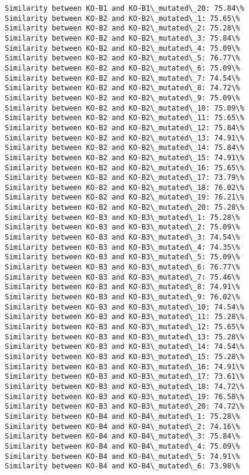 \documentclass[11pt]{article}
\begin{document}
\begin{Verbatim}[commandchars=\\\{\}]
Similarity between KO-B1 and KO-B1\_mutated\_20: 75.84\%
Similarity between KO-B2 and KO-B2\_mutated\_1: 75.65\%
Similarity between KO-B2 and KO-B2\_mutated\_2: 75.28\%
Similarity between KO-B2 and KO-B2\_mutated\_3: 75.84\%
Similarity between KO-B2 and KO-B2\_mutated\_4: 75.09\%
Similarity between KO-B2 and KO-B2\_mutated\_5: 76.77\%
Similarity between KO-B2 and KO-B2\_mutated\_6: 75.09\%
Similarity between KO-B2 and KO-B2\_mutated\_7: 74.54\%
Similarity between KO-B2 and KO-B2\_mutated\_8: 74.72\%
Similarity between KO-B2 and KO-B2\_mutated\_9: 75.09\%
Similarity between KO-B2 and KO-B2\_mutated\_10: 75.09\%
Similarity between KO-B2 and KO-B2\_mutated\_11: 75.65\%
Similarity between KO-B2 and KO-B2\_mutated\_12: 75.84\%
Similarity between KO-B2 and KO-B2\_mutated\_13: 74.91\%
Similarity between KO-B2 and KO-B2\_mutated\_14: 75.84\%
Similarity between KO-B2 and KO-B2\_mutated\_15: 74.91\%
Similarity between KO-B2 and KO-B2\_mutated\_16: 75.65\%
Similarity between KO-B2 and KO-B2\_mutated\_17: 73.79\%
Similarity between KO-B2 and KO-B2\_mutated\_18: 76.02\%
Similarity between KO-B2 and KO-B2\_mutated\_19: 76.21\%
Similarity between KO-B2 and KO-B2\_mutated\_20: 75.28\%
Similarity between KO-B3 and KO-B3\_mutated\_1: 75.28\%
Similarity between KO-B3 and KO-B3\_mutated\_2: 75.09\%
Similarity between KO-B3 and KO-B3\_mutated\_3: 74.54\%
Similarity between KO-B3 and KO-B3\_mutated\_4: 74.35\%
Similarity between KO-B3 and KO-B3\_mutated\_5: 75.09\%
Similarity between KO-B3 and KO-B3\_mutated\_6: 76.77\%
Similarity between KO-B3 and KO-B3\_mutated\_7: 75.46\%
Similarity between KO-B3 and KO-B3\_mutated\_8: 74.91\%
Similarity between KO-B3 and KO-B3\_mutated\_9: 76.02\%
Similarity between KO-B3 and KO-B3\_mutated\_10: 74.54\%
Similarity between KO-B3 and KO-B3\_mutated\_11: 75.28\%
Similarity between KO-B3 and KO-B3\_mutated\_12: 75.65\%
Similarity between KO-B3 and KO-B3\_mutated\_13: 75.28\%
Similarity between KO-B3 and KO-B3\_mutated\_14: 74.54\%
Similarity between KO-B3 and KO-B3\_mutated\_15: 75.28\%
Similarity between KO-B3 and KO-B3\_mutated\_16: 74.91\%
Similarity between KO-B3 and KO-B3\_mutated\_17: 73.61\%
Similarity between KO-B3 and KO-B3\_mutated\_18: 74.72\%
Similarity between KO-B3 and KO-B3\_mutated\_19: 76.58\%
Similarity between KO-B3 and KO-B3\_mutated\_20: 74.72\%
Similarity between KO-B4 and KO-B4\_mutated\_1: 75.28\%
Similarity between KO-B4 and KO-B4\_mutated\_2: 74.16\%
Similarity between KO-B4 and KO-B4\_mutated\_3: 75.84\%
Similarity between KO-B4 and KO-B4\_mutated\_4: 75.09\%
Similarity between KO-B4 and KO-B4\_mutated\_5: 74.91\%
Similarity between KO-B4 and KO-B4\_mutated\_6: 73.98\%

\end{Verbatim}
\end{document}
